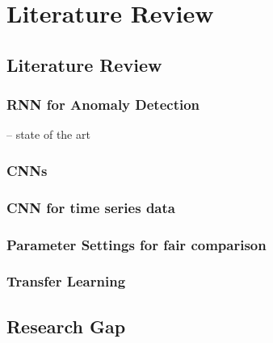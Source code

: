 
\chapter{Literature Review} %

\label{2.} %



\section{Literature Review}

\subsection{RNN for Anomaly Detection}

 -- state of the art

\subsection{CNNs}

\subsection{CNN for time series data}

\subsection{Parameter Settings for fair comparison}

\subsection{Transfer Learning}

\section{Research Gap}
